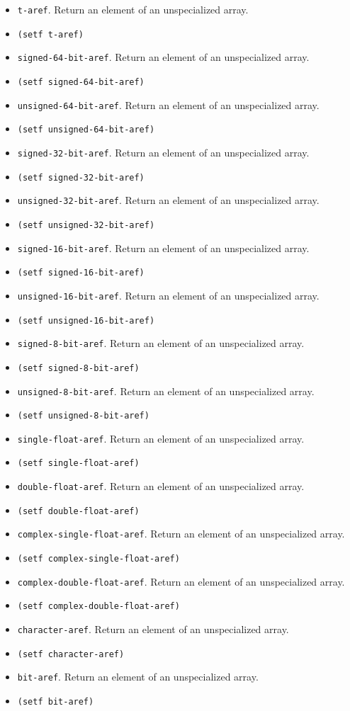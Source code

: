 \begin{itemize}
\item \texttt{t-aref}.  Return an element of an unspecialized array.
\item \texttt{(setf t-aref)}
\item \texttt{signed-64-bit-aref}.  Return an element of an unspecialized array.
\item \texttt{(setf signed-64-bit-aref)}
\item \texttt{unsigned-64-bit-aref}.  Return an element of an unspecialized array.
\item \texttt{(setf unsigned-64-bit-aref)}
\item \texttt{signed-32-bit-aref}.  Return an element of an unspecialized array.
\item \texttt{(setf signed-32-bit-aref)}
\item \texttt{unsigned-32-bit-aref}.  Return an element of an unspecialized array.
\item \texttt{(setf unsigned-32-bit-aref)}
\item \texttt{signed-16-bit-aref}.  Return an element of an unspecialized array.
\item \texttt{(setf signed-16-bit-aref)}
\item \texttt{unsigned-16-bit-aref}.  Return an element of an unspecialized array.
\item \texttt{(setf unsigned-16-bit-aref)}
\item \texttt{signed-8-bit-aref}.  Return an element of an unspecialized array.
\item \texttt{(setf signed-8-bit-aref)}
\item \texttt{unsigned-8-bit-aref}.  Return an element of an unspecialized array.
\item \texttt{(setf unsigned-8-bit-aref)}
\item \texttt{single-float-aref}.  Return an element of an unspecialized array.
\item \texttt{(setf single-float-aref)}
\item \texttt{double-float-aref}.  Return an element of an unspecialized array.
\item \texttt{(setf double-float-aref)}
\item \texttt{complex-single-float-aref}.  Return an element of an unspecialized array.
\item \texttt{(setf complex-single-float-aref)}
\item \texttt{complex-double-float-aref}.  Return an element of an unspecialized array.
\item \texttt{(setf complex-double-float-aref)}
\item \texttt{character-aref}.  Return an element of an unspecialized array.
\item \texttt{(setf character-aref)}
\item \texttt{bit-aref}.  Return an element of an unspecialized array.
\item \texttt{(setf bit-aref)}
\end{itemize}

